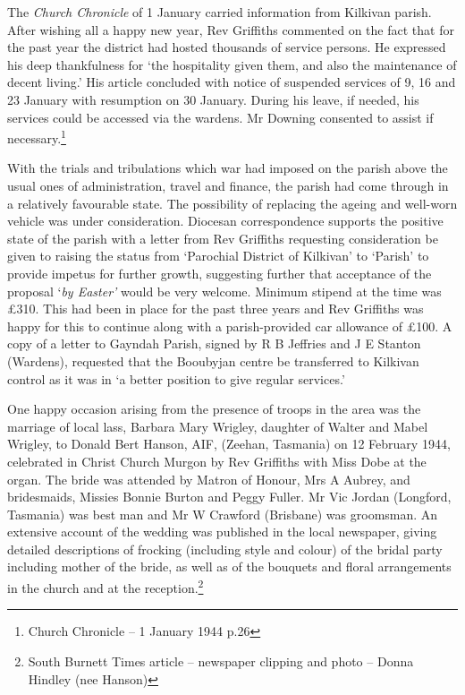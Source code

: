 The \emph{Church Chronicle} of 1 January carried information from Kilkivan parish. After wishing all a happy new year, Rev Griffiths commented on the fact that for the past year the district had hosted thousands of service persons. He expressed his deep thankfulness for `the hospitality given them, and also the maintenance of decent living.' His article concluded with notice of suspended services of 9, 16 and 23 January with resumption on 30 January. During his leave, if needed, his services could be accessed via the wardens. Mr Downing consented to assist if necessary.\footnote{Church Chronicle -- 1 January 1944 p.26}


With the trials and tribulations which war had imposed on the parish above the usual ones of administration, travel and finance, the parish had come through in a relatively favourable state. The possibility of replacing the ageing and well-worn vehicle was under consideration. Diocesan correspondence supports the positive state of the parish with a letter from Rev Griffiths requesting consideration be given to raising the status from `Parochial District of Kilkivan' to `Parish' to provide impetus for further growth, suggesting further that acceptance of the proposal `\emph{by Easter'} would be very welcome. Minimum stipend at the time was \pounds310. This had been in place for the past three years and Rev Griffiths was happy for this to continue along with a parish-provided car allowance of \pounds100. A copy of a letter to Gayndah Parish, signed by R B Jeffries and J E Stanton (Wardens), requested that the Booubyjan centre be transferred to Kilkivan control as it was in `a better position to give regular services.'



One happy occasion arising from the presence of troops in the area was the marriage of local lass, Barbara Mary Wrigley, daughter of Walter and Mabel Wrigley, to Donald Bert Hanson, AIF, (Zeehan, Tasmania) on 12 February 1944, celebrated in Christ Church Murgon by Rev Griffiths with Miss Dobe at the organ. The bride was attended by Matron of Honour, Mrs A Aubrey, and bridesmaids, Missies Bonnie Burton and Peggy Fuller. Mr Vic Jordan (Longford, Tasmania) was best man and Mr W Crawford (Brisbane) was groomsman. An extensive account of the wedding was published in the local newspaper, giving detailed descriptions of frocking (including style and colour) of the bridal party including mother of the bride, as well as of the bouquets and floral arrangements in the church and at the reception.\footnote{South Burnett Times article -- newspaper clipping and photo -- Donna Hindley (nee Hanson)}








